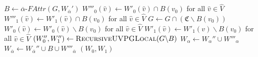 {\begin{algorithm}
\begin{algorithmic}[1]
		\EndIf
		\State $B \gets \overline{\alpha}\textit{-FAttr}(G,W_{\overline{\alpha}}')$
		\If{$\overline{\alpha} \in \Delta$}
		\State $W'''_0(\hat{v}) \gets W'_0(\hat{v}) \cap B(v_0)$ for all $\hat{v} \in \hat{V}$
		\State $W'''_1(\hat{v}) \gets W'_1(\hat{v}) \cap B(v_0)$ for all $\hat{v} \in \hat{V}$
		\State $G \gets G \cap (\mathfrak{C} \backslash B(v_0))$
		\State $W'_0(\hat{v}) \gets W'_0(\hat{v}) \backslash B(v_0)$ for all $\hat{v} \in \hat{V}$
		\State $W'_1(\hat{v}) \gets W'_1(\hat{v}) \backslash B(v_0)$ for all $\hat{v} \in \hat{V}$
		\EndIf
		\State $(W_0'', W_1'') \gets \textsc{RecursiveUVPGLocal}(G \backslash B)$
		\State $W_\alpha \gets W_\alpha'' \cup W'''_{\alpha}$
		\State $W_{\overline{\alpha}} \gets W_{\overline{\alpha}}'' \cup B \cup W'''_{\overline{\alpha}}$
		\EndIf
		\State \Return $(W_0, W_1)$
	\end{algorithmic}
\end{algorithm}}
